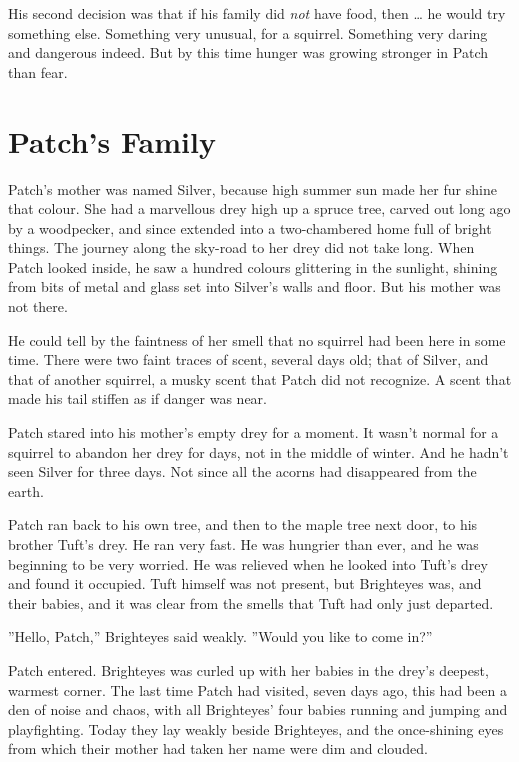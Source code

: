 \documentclass[12pt]{book}
\begin{document}
His second decision was that if his family did {\it not} have food, then \ldots{}
he would try something else. Something very unusual, for a squirrel. Something very daring and dangerous indeed. But by this time hunger was growing stronger in Patch than fear.


\section{Patch's Family}

Patch's mother was named Silver, because high summer sun made her fur shine that colour. She had a marvellous drey high up a spruce tree, carved out long ago by a woodpecker, and since extended into a two-chambered home full of bright things. The journey along the sky-road to her drey did not take long. When Patch looked inside, he saw a hundred colours glittering in the sunlight, shining from bits of metal and glass set into Silver's walls and floor. But his mother was not there.

He could tell by the faintness of her smell that no squirrel had been here in some time. There were two faint traces of scent, several days old; that of Silver, and that of another squirrel, a musky scent that Patch did not recognize. A scent that made his tail stiffen as if danger was near.

Patch stared into his mother's empty drey for a moment. It wasn't normal for a squirrel to abandon her drey for days, not in the middle of winter. And he hadn't seen Silver for three days. Not since all the acorns had disappeared from the earth.

Patch ran back to his own tree, and then to the maple tree next door, to his brother Tuft's drey. He ran very fast. He was hungrier than ever, and he was beginning to be very worried. He was relieved when he looked into Tuft's drey and found it occupied. Tuft himself was not present, but Brighteyes was, and their babies, and it was clear from the smells that Tuft had only just departed.

''Hello, Patch,'' Brighteyes said weakly. ''Would you like to come in?''

Patch entered. Brighteyes was curled up with her babies in the drey's deepest, warmest corner. The last time Patch had visited, seven days ago, this had been a den of noise and chaos, with all Brighteyes' four babies running and jumping and playfighting. Today they lay weakly beside Brighteyes, and the once-shining eyes from which their mother had taken her name were dim and clouded.
\end{document}
